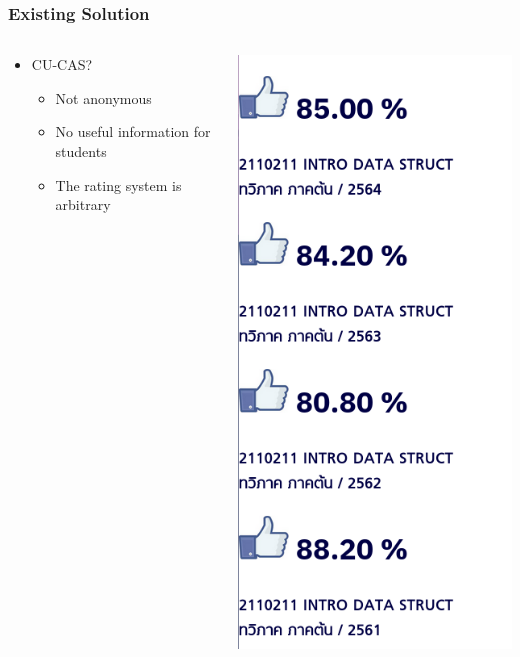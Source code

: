 \documentclass[aspectratio=169]{beamer}
\begin{document}
\begin{frame}
    \frametitle{Existing Solution}
    \begin{columns}
        \begin{column}{0.5\textwidth}
            \begin{itemize}
                \item CU-CAS?
                      \begin{itemize}
                          \item {\color{red}Not anonymous}
                          \item {No useful information for students}
                          \item {The rating system is arbitrary}
                      \end{itemize}
            \end{itemize}
        \end{column}
        \begin{column}{0.5\textwidth}
            \centering
            \includegraphics[scale=0.3]{cucas_score.png}
        \end{column}
    \end{columns}
\end{frame}
\end{document}
